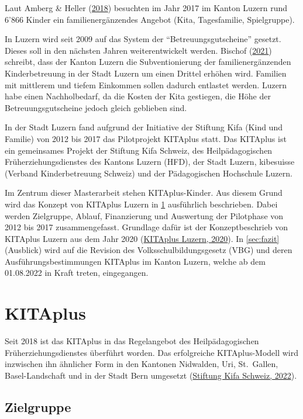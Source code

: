 \documentclass[
  ngerman,
  11pt,
  paper=a4,
  twoside,
  titlepage=true,
  openright,
  abstract=on,
  toc=listofnumbered,
  numbers=noenddot,
  chapterprefix=true,
  headings=optiontohead,
  svgnames,
  dvipsnames]{scrreprt}
\begin{document}
Laut Amberg \& Heller
(\protect\hyperlink{ref-kinderbetreuungluzern}{2018}) besuchten im Jahr
2017 im Kanton Luzern rund 6’866 Kinder ein familienergänzendes Angebot
(Kita, Tagesfamilie, Spielgruppe).

In Luzern wird seit 2009 auf das System der “Betreuungsgutscheine”
gesetzt. Dieses soll in den nächsten Jahren weiterentwickelt werden.
Bischof (\protect\hyperlink{ref-luzernerzeitung}{2021}) schreibt, dass
der Kanton Luzern die Subventionierung der familienergänzenden
Kinderbetreuung in der Stadt Luzern um einen Drittel erhöhen wird.
Familien mit mittlerem und tiefem Einkommen sollen dadurch entlastet
werden. Luzern habe einen Nachholbedarf, da die Kosten der Kita
gestiegen, die Höhe der Betreuungsgutscheine jedoch gleich geblieben
sind.

In der Stadt Luzern fand aufgrund der Initiative der Stiftung Kifa (Kind
und Familie) von 2012 bis 2017 das Pilotprojekt KITAplus statt. Das
KITAplus ist ein gemeinsames Projekt der Stiftung Kifa Schweiz, des
Heilpädagogischen Früherziehungsdienstes des Kantons Luzern (HFD), der
Stadt Luzern, kibesuisse (Verband Kinderbetreuung Schweiz) und der
Pädagogischen Hochschule Luzern.

Im Zentrum dieser Masterarbeit stehen KITAplus-Kinder. Aus diesem Grund
wird das Konzept von KITAplus Luzern in \cref{sec:kitaplus} ausführlich
beschrieben. Dabei werden Zielgruppe, Ablauf, Finanzierung und
Auswertung der Pilotphase von 2012 bis 2017 zusammengefasst. Grundlage
dafür ist der Konzeptbeschrieb von KITAplus Luzern aus dem Jahr 2020
(\protect\hyperlink{ref-konzeptKitaPlus}{KITAplus Luzern, 2020}). In
\cref{sec:fazit} (Ausblick) wird auf die Revision des
Volksschulbildungsgesetz (VBG) und deren Ausführungsbestimmungen
KITAplus im Kanton Luzern, welche ab dem 01.08.2022 in Kraft treten,
eingegangen.

\hypertarget{sec:kitaplus}{%
\section{KITAplus}\label{sec:kitaplus}}

Seit 2018 ist das KITAplus in das Regelangebot des Heilpädagogischen
Früherziehungsdienstes überführt worden. Das erfolgreiche
KITAplus-Modell wird inzwischen ihn ähnlicher Form in den Kantonen
Nidwalden, Uri, St.~Gallen, Basel-Landschaft und in der Stadt Bern
umgesetzt (\protect\hyperlink{ref-stiftungkifa}{Stiftung Kifa Schweiz,
2022}).

\hypertarget{zielgruppe}{%
\subsection{Zielgruppe}\label{zielgruppe}}
\end{document}
